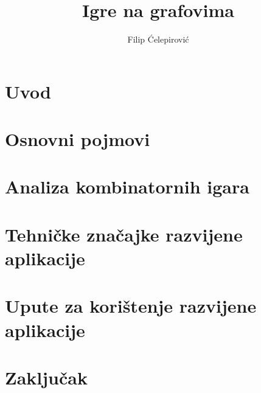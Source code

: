\documentclass[times, utf8, zavrsni, numeric]{fer}
\begin{document}

\title{Igre na grafovima}

\author{Filip Ćelepirović}

\maketitle





\tableofcontents
\listoffigures
\listoftables



\chapter{Uvod}


\chapter{Osnovni pojmovi}


\chapter{Analiza kombinatornih igara}


\chapter{Tehničke značajke razvijene aplikacije}


\chapter{Upute za korištenje razvijene aplikacije}


\chapter{Zaključak}







\end{document}
